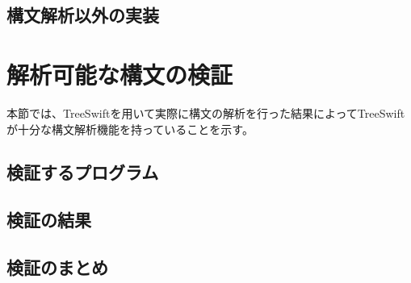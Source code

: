 \subsection{構文解析以外の実装}


\section{解析可能な構文の検証}

本節では、TreeSwiftを用いて実際に構文の解析を行った結果によってTreeSwiftが十分な構文解析機能を持っていることを示す。

\subsection{検証するプログラム}

\subsection{検証の結果}

\subsection{検証のまとめ}

